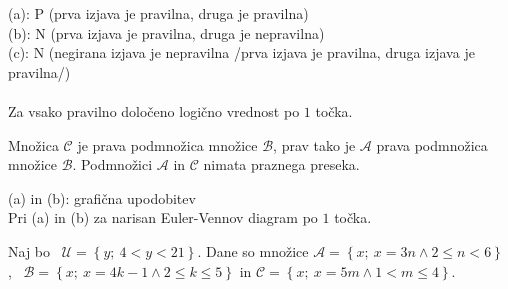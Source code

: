 \documentclass[addpoints,12pt]{exam}
\begin{document}
\begin{questions}
    \begin{solution}
        (a): P (prva izjava je pravilna, druga je pravilna) \\
        (b): N (prva izjava je pravilna, druga je nepravilna) \\
        (c): N (negirana izjava je nepravilna /prva izjava je pravilna, druga izjava je pravilna/) \\ \\
        Za vsako pravilno določeno logično vrednost po $1$ točka.
    \end{solution}



    \newpage



    \question
    Množica $\mathcal{C}$ je prava podmnožica množice $\mathcal{B}$, prav tako je $\mathcal{A}$ prava podmnožica množice $\mathcal{B}$. Podmnožici $\mathcal{A}$ in $\mathcal{C}$ nimata praznega preseka.

    \begin{solution}[1cm]
        (a) in (b): grafična upodobitev \\
        Pri (a) in (b) za narisan Euler-Vennov diagram po $1$ točka.
    \end{solution}




    \newpage

    \question
    Naj bo~ $\mathcal{U}=\left\{y;\ 4<y<21\right\}$. Dane so množice $\mathcal{A}=\left\{x;\ x=3n \land 2\leq n<6\right\}$,~ $\mathcal{B}=\left\{x;\ x=4k-1 \land 2\leq k\leq 5\right\}$ in $\mathcal{C}=\left\{x;\ x=5m \land 1<m\leq 4\right\}$. 
\end{questions}
\end{document}
